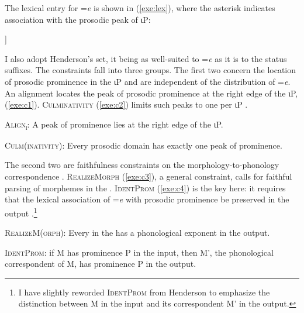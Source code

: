 \documentclass[output=paper,
modfonts
]{LSP/langsci}
\begin{document}
The lexical entry for =\emph{e} is shown in (\ref{exe:lex}), where the asterisk indicates association with
the prosodic peak of ιP:
\begin{exe}
	\ex\label{exe:lex}
	\begin{forest}
		[$\ast$
			[\emph{e}]
		]
	\end{forest}
\end{exe}
I also adopt Henderson's  set, it being as well-suited to  =\emph{e} as it is to the  status suffixes. 
The constraints fall into three groups. 
The first two concern the location of prosodic prominence in the ιP and are independent
of the distribution of =\emph{e}. 
An alignment  \citep{mccarthy1993}
 locates the peak of prosodic prominence at the right edge of the ιP, (\ref{exe:c1}).
\textsc{Culminativity} (\ref{exe:c2}) limits such peaks to one per ιP \citep{hayes1995}.
\begin{exe}
\ex \textsc{Align\textsubscript{ι}}:  A peak of prominence lies at the right edge of the ιP.
\label{exe:c1}
\end{exe}
\begin{exe}
\ex \textsc{Culm(inativity)}: Every prosodic domain has exactly one peak of prominence.
\label{exe:c2}
\end{exe}
The second two are faithfulness constraints on the morphology-to-phonology correspondence \citep{prince1993,mccarthy1995}.
 \textsc{RealizeMorph} (\ref{exe:c3}), a general
constraint, calls for faithful parsing of morphemes in the  \citep{kurisu2001}. 
\textsc{IdentProm} (\ref{exe:c4}) is the key  here: it requires that the lexical association of =\emph{e} with prosodic prominence be preserved in the output \citep{henderson2012ais}.\footnote
{I have slightly reworded \textsc{IdentProm} from Henderson to emphasize the distinction between M in the input
and its correspondent M' in the output.} 
\begin{exe}
\ex \textsc{RealizeM(orph)}: Every  in the  has a phonological exponent in the output.
\label{exe:c3}
\end{exe}
\begin{exe}
\ex \textsc{IdentProm}: if  M has prominence P in the input, then M', the phonological correspondent of M, 
has prominence P in the output.
\label{exe:c4}
\end{exe}
\end{document}
